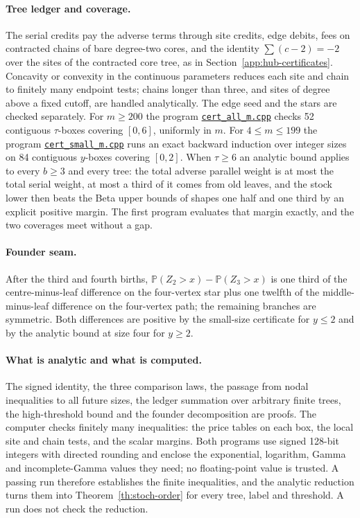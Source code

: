 \documentclass[11pt]{article}
\newcommand{\ordersrc}[2]{\href{https://github.com/uzay-eth/friend-tree-exponent/blob/62081cad01112c42c2011ac3eed11aa3aa665e09/#1}{#2}}
\theoremstyle{remark}
\numberwithin{equation}{section}
\newcommand{\Prob}{\mathbb P}
\begin{document}
\paragraph{Tree ledger and coverage.}
The serial credits pay the adverse terms through site credits, edge debits, fees on contracted chains of bare degree-two cores, and the identity $\sum(c-2)=-2$ over the sites of the contracted core tree, as in Section~\ref{app:hub-certificates}. Concavity or convexity in the continuous parameters reduces each site and chain to finitely many endpoint tests; chains longer than three, and sites of degree above a fixed cutoff, are handled analytically. The edge seed and the stars are checked separately. For $m\ge200$ the program \ordersrc{round3/q3-birth-order/cert_all_m.cpp}{\texttt{cert\_all\_m.cpp}} checks 52 contiguous $\tau$-boxes covering $[0,6]$, uniformly in $m$. For $4\le m\le199$ the program \ordersrc{round3/q3-birth-order/cert_small_m.cpp}{\texttt{cert\_small\_m.cpp}} runs an exact backward induction over integer sizes on 84 contiguous $y$-boxes covering $[0,2]$. When $\tau\ge6$ an analytic bound applies to every $b\ge3$ and every tree: the total adverse parallel weight is at most the total serial weight, at most a third of it comes from old leaves, and the stock lower then beats the Beta upper bounds of shapes one half and one third by an explicit positive margin. The first program evaluates that margin exactly, and the two coverages meet without a gap.

\paragraph{Founder seam.}
After the third and fourth births, $\Prob(Z_2>x)-\Prob(Z_3>x)$ is one third of the centre-minus-leaf difference on the four-vertex star plus one twelfth of the middle-minus-leaf difference on the four-vertex path; the remaining branches are symmetric. Both differences are positive by the small-size certificate for $y\le2$ and by the analytic bound at size four for $y\ge2$.

\paragraph{What is analytic and what is computed.}
The signed identity, the three comparison laws, the passage from nodal inequalities to all future sizes, the ledger summation over arbitrary finite trees, the high-threshold bound and the founder decomposition are proofs. The computer checks finitely many inequalities: the price tables on each box, the local site and chain tests, and the scalar margins. Both programs use signed 128-bit integers with directed rounding and enclose the exponential, logarithm, Gamma and incomplete-Gamma values they need; no floating-point value is trusted. A passing run therefore establishes the finite inequalities, and the analytic reduction turns them into Theorem~\ref{th:stoch-order} for every tree, label and threshold. A run does not check the reduction.
\end{document}
